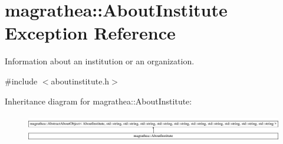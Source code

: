 \hypertarget{exceptionmagrathea_1_1AboutInstitute}{\section{magrathea\-:\-:About\-Institute Exception Reference}
\label{exceptionmagrathea_1_1AboutInstitute}
}


Information about an institution or an organization.  




{\ttfamily \#include $<$aboutinstitute.\-h$>$}

Inheritance diagram for magrathea\-:\-:About\-Institute\-:\begin{figure}[H]
\begin{center}
\leavevmode
\includegraphics[height=1.216069cm]{exceptionmagrathea_1_1AboutInstitute}
\end{center}
\end{figure}
